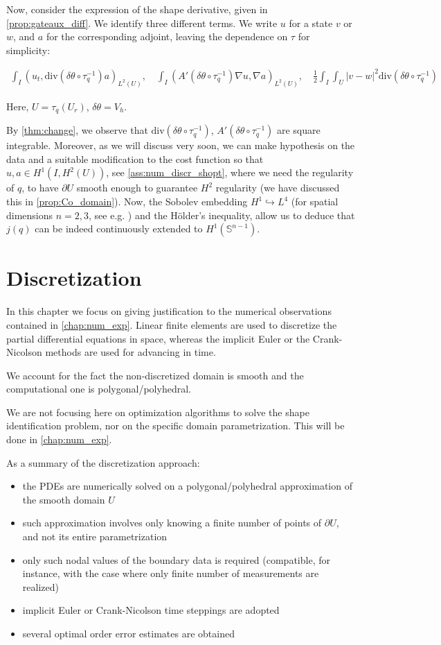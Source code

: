 \documentclass[english,a4paper,9pt,oneside]{scrbook}	%
\theoremstyle{break}
\theoremstyle{remark}
\newcommand{\mS}{\mathbb{S}^{n-1}}
\newcommand{\emb}{\hookrightarrow}
\newcommand{\te}{\theta}
\newcommand{\dive}{\text{div}}
\begin{document}
Now, consider the expression of the shape derivative, given in \cref{prop:gateaux_diff}. We identify three different terms. We write $u$ for a state $v$ or $w$, and $a$ for the corresponding adjoint, leaving the dependence on $\tau$ for simplicity:

\begin{align*}
\int_I (u_t , \dive(\delta \te \circ \tau_q^{-1}) a)_{L^2(U)}, \quad \int_I (A'(\delta\te\circ \tau_q^{-1} )\nabla u, \nabla a)_{L^2(U)}, \quad \frac{1}{2}\int_I\int_{U} |v-w|^2\dive(\delta \te\circ \tau_q^{-1})
\end{align*}

Here, $U = \tau_q(U_r)$, $\delta \te = V_h$.

By \cref{thm:change}, we observe that $\dive(\delta \te\circ \tau_q^{-1})$, $A'(\delta\te\circ \tau_q^{-1} )$ are square integrable. Moreover, as we will discuss very soon, we can make hypothesis on the data and a suitable modification to the cost function so that $u, a \in H^1(I, H^2(U))$, see \cref{ass:num_discr_shopt}, where we need the regularity of $q$, to have $\partial U$ smooth enough to guarantee $H^2$ regularity (we have discussed this in \cref{prop:Co_domain}). Now, the Sobolev embedding $H^1\emb L^4$ (for spatial dimensions $n=2,3$, see e.g. \cite{adams}) and the Hölder's inequality, allow us to deduce that $j(q)$ can be indeed continuously extended to $H^1(\mS)$.


\chapter{Discretization}
\label{chap:discretization}
In this chapter we focus on giving justification to the numerical observations contained in \cref{chap:num_exp}. Linear finite elements are used to discretize the partial differential equations in space, whereas the implicit Euler or the Crank-Nicolson methods are used for advancing in time.

We account for the fact the non-discretized domain is smooth and the computational one is polygonal/polyhedral. 

We are not focusing here on optimization algorithms to solve the shape identification problem, nor on the specific domain parametrization. This will be done in \cref{chap:num_exp}.


As a summary of the discretization approach:

\begin{itemize}
	\item the PDEs are numerically solved on a polygonal/polyhedral approximation of the smooth domain $U$
	\item such approximation involves only knowing a finite number of points of $\partial U$, and not its entire parametrization
	\item only such nodal values of the boundary data is required (compatible, for instance, with the case where only finite number of measurements are realized)
	\item implicit Euler or Crank-Nicolson time steppings are adopted
	\item several optimal order error estimates are obtained
\end{itemize}
\end{document}
